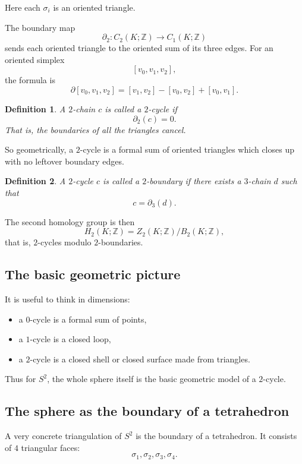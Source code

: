 \documentclass[12pt,a4paper]{article}
\newcommand{\Z}{\mathbb{Z}}
\newtheorem{definition}{Definition}[section]
\theoremstyle{notespace}
\begin{document}
Here each \(\sigma_i\) is an oriented triangle.

The boundary map
\[
\partial_2:C_2(K;\Z)\to C_1(K;\Z)
\]
sends each oriented triangle to the oriented sum of its three edges. For an oriented simplex
\[
[v_0,v_1,v_2],
\]
the formula is
\[
\partial [v_0,v_1,v_2]
=
[v_1,v_2]-[v_0,v_2]+[v_0,v_1].
\]

\begin{definition}
	A \(2\)-chain \(c\) is called a \emph{\(2\)-cycle} if
	\[
	\partial_2(c)=0.
	\]
	That is, the boundaries of all the triangles cancel.
\end{definition}

So geometrically, a \(2\)-cycle is a formal sum of oriented triangles which closes up with no leftover boundary edges.

\begin{definition}
	A \(2\)-cycle \(c\) is called a \emph{\(2\)-boundary} if there exists a \(3\)-chain \(d\) such that
	\[
	c=\partial_3(d).
	\]
\end{definition}

The second homology group is then
\[
H_2(K;\Z)=Z_2(K;\Z)/B_2(K;\Z),
\]
that is, \(2\)-cycles modulo \(2\)-boundaries.

\subsection{The basic geometric picture}

It is useful to think in dimensions:

\begin{itemize}
	\item a \(0\)-cycle is a formal sum of points,
	\item a \(1\)-cycle is a closed loop,
	\item a \(2\)-cycle is a closed shell or closed surface made from triangles.
\end{itemize}

Thus for \(S^2\), the whole sphere itself is the basic geometric model of a \(2\)-cycle.

\subsection{The sphere as the boundary of a tetrahedron}

A very concrete triangulation of \(S^2\) is the boundary of a tetrahedron. It consists of \(4\) triangular faces:
\[
\sigma_1,\sigma_2,\sigma_3,\sigma_4.
\]
\end{document}
